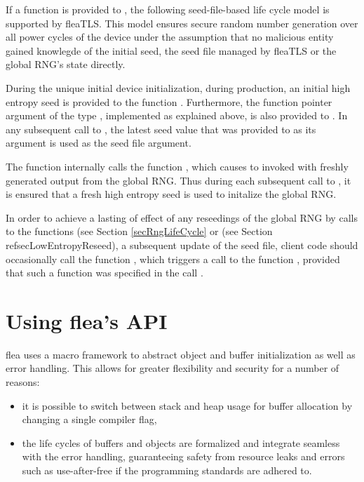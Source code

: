 \documentclass[a4paper,11pt]{scrartcl}
\begin{document}
If a \funcSaveRngState function is provided to \funcLibInit, the following seed-file-based life cycle model
is supported by fleaTLS. This model ensures secure random number generation over
all power cycles of the device under the
assumption that no malicious entity gained knowlegde of the initial seed, the
seed file managed by fleaTLS or the global RNG's state directly.

During the unique initial device initialization, \eg
during production, an initial high entropy seed is provided to the
function \funcLibInit. Furthermore, the function pointer argument of the type
\funcSaveRngState, implemented as explained above, is also provided to
\funcLibInit. In any subsequent call to \funcLibInit, the latest seed value that was
provided to \funcSaveRngState as its argument is used as the seed file argument.

The function \funcLibInit internally calls the function
, which causes \funcSaveRngState to
invoked with freshly generated output from the global RNG. Thus during each
subsequent call to \funcLibInit, it is ensured that a fresh high entropy seed is
used to initalize the global RNG.

In order to achieve a lasting of effect of any reseedings of the global RNG
by calls to the functions   (see
Section \ref{secRngLifeCycle} or
 (see Section
ref{secLowEntropyReseed}), \ie a subsequent update of the seed file, client code
should occasionally call the function
, which triggers a call to the
function \funcSaveRngState, provided that such a function was specified in the
call \funcLibInit.

\section{Using flea's API}

flea uses a macro framework to abstract object and buffer initialization as well
as error handling. This allows for greater flexibility and security for a number of reasons:
\begin{itemize}
  \item it is possible to switch between stack and heap usage for buffer allocation
  by changing a single compiler flag,
  \item the life cycles of buffers and objects are formalized and integrate
    seamless with the error handling, guaranteeing safety from resource leaks
    and errors such as use-after-free if the programming standards are adhered
    to.
\end{itemize}
\end{document}
